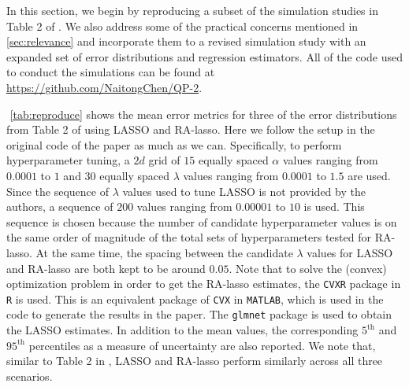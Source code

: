 In this section, we begin by reproducing a subset of the simulation studies in Table 2 of \citet{fan2017estimation}. We also address some of the practical concerns mentioned in \cref{sec:relevance} and incorporate them to a revised simulation study with an expanded set of error distributions and regression estimators. All of the code used to conduct the simulations can be found at \url{https://github.com/NaitongChen/QP-2}.

$ $\newline
\cref{tab:reproduce} shows the mean error metrics for three of the error distributions from Table 2 of \citet{fan2017estimation} using LASSO and RA-lasso. Here we follow the setup in the original code of the paper as much as we can. Specifically, to perform hyperparameter tuning, a $2d$ grid of $15$ equally spaced $\alpha$ values ranging from $0.0001$ to $1$ and $30$ equally spaced $\lambda$ values ranging from $0.0001$ to $1.5$ are used. Since the sequence of $\lambda$ values used to tune LASSO is not provided by the authors, a sequence of $200$ values ranging from $0.00001$ to $10$ is used. This sequence is chosen because the number of candidate hyperparameter values is on the same order of magnitude of the total sets of hyperparameters tested for RA-lasso. At the same time, the spacing between the candidate $\lambda$ values for LASSO and RA-lasso are both kept to be around $0.05$. Note that to solve the (convex) optimization problem in order to get the RA-lasso estimates, the \texttt{CVXR} package in \texttt{R} is used. This is an equivalent package of \texttt{CVX} in \texttt{MATLAB}, which is used in the code to generate the results in the paper. The \texttt{glmnet} package is used to obtain the LASSO estimates. In addition to the mean values, the corresponding $5^\text{th}$ and $95^\text{th}$ percentiles as a measure of uncertainty are also reported. We note that, similar to Table 2 in \citet{fan2017estimation}, LASSO and RA-lasso perform similarly across all three scenarios.



